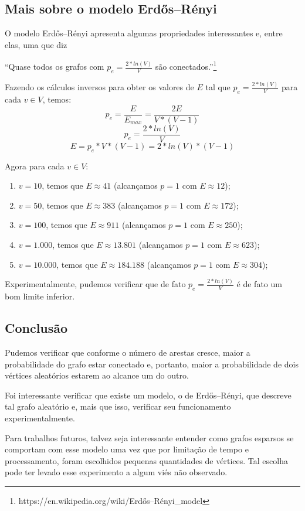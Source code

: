 \documentclass[12pt,letterpaper]{article}
\begin{document}
\subsection {Mais sobre o modelo Erdős–Rényi}
O modelo Erdős–Rényi apresenta algumas propriedades interessantes e, entre elas, uma que diz

\enquote{Quase todos os grafos com $p_e = \frac{2*ln(V)}{V}$ são conectados.}\footnote{https://en.wikipedia.org/wiki/Erdős–Rényi_model}

Fazendo os cálculos inversos para obter os valores de $E$ tal que $p_e = \frac{2*ln(V)}{V}$ para cada $v \in V$, temos:
$$ p_e = \frac{E}{E_{max}} = \frac{2E}{V * (V-1)} $$
$$ p_e = \frac{2*ln(V)}{V} $$
$$ E = p_e * V * (V - 1) = 2 * ln(V) * (V - 1) $$

Agora para cada $v \in V$:
\begin{enumerate}
    \item $v = 10$, temos que $E \approx 41$ (alcançamos $p = 1$ com $E \approx 12$);
    \item $v = 50$, temos que $E \approx 383$ (alcançamos $p = 1$ com $E \approx 172$);
    \item $v = 100$, temos que $E \approx 911$ (alcançamos $p = 1$ com $E \approx 250$);
    \item $v = 1.000$, temos que $E \approx 13.801$ (alcançamos $p = 1$ com $E \approx 623$);
    \item $v = 10.000$, temos que $E \approx 184.188$ (alcançamos $p = 1$ com $E \approx 304$);
\end{enumerate}

Experimentalmente, pudemos verificar que de fato $p_e = \frac{2*ln(V)}{V}$ é de fato um bom limite inferior.

\subsection {Conclusão}
Pudemos verificar que conforme o número de arestas cresce, maior a probabilidade do grafo estar conectado e, portanto, maior a probabilidade de dois vértices aleatórios estarem ao alcance um do outro.

Foi interessante verificar que existe um modelo, o de Erdős–Rényi, que descreve tal grafo aleatório e, mais que isso, verificar seu funcionamento experimentalmente.

Para trabalhos futuros, talvez seja interessante entender como grafos esparsos se comportam com esse modelo uma vez que por limitação de tempo e processamento, foram escolhidos pequenas quantidades de vértices. Tal escolha pode ter levado esse experimento a algum viés não observado.
\end{document}
